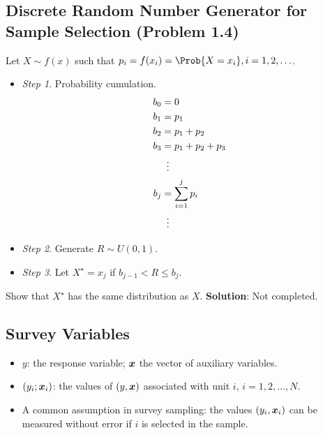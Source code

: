 \subsection*{Discrete Random Number Generator for Sample Selection (Problem 1.4)}
\begin{Example}{}
    Let $ X \sim f(x) $ such that $p_i=f(x_i)=\Prob{X=x_i},i=1,2,\ldots$.
    \begin{itemize}
        \item \emph{Step 1}. Probability cumulation.
              \begin{align*}
                  b_0 & =0                 \\
                  b_1 & =p_1               \\
                  b_2 & =p_1+p_2           \\
                  b_3 & =p_1+p_2+p_3       \\
                      & \vdotswithin{=}    \\
                  b_j & =\sum_{i=1}^{j}p_i \\
                      & \vdotswithin{=}
              \end{align*}
        \item \emph{Step 2}. Generate $ R\sim U(0,1) $.
        \item \emph{Step 3}. Let $ X^\star=x_j $ if $ b_{j-1}<R\le b_j $.
    \end{itemize}
    Show that $ X^\star $ has the same distribution as $ X $.
    \tcblower{}
    \textbf{Solution}: Not completed.
\end{Example}
\subsection*{Survey Variables}
\begin{Regular}{}
    \begin{itemize}
        \item $ y $: the response variable; $ \bm{x} $
              the vector of auxiliary variables.
        \item $ (y_i;\bm{x}_i) $: the values of $ (y,\bm{x}) $
              associated with unit $ i $, $ i=1,2,\ldots,N $.
        \item A common assumption in survey sampling: the values $ (y_i,\bm{x}_i) $
              can be measured without error if $ i $ is selected in the sample.
    \end{itemize}
\end{Regular}
